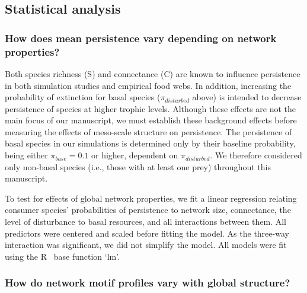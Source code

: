 \documentclass[12pt]{article}
\begin{document}
\begin{spacing}{2.0}
	\subsection*{Statistical analysis} 

        \subsubsection*{How does mean persistence vary depending on network properties?}
        
            Both species richness (S) and connectance (C) are known to influence persistence in both simulation studies and empirical food webs.
            In addition, increasing the probability of extinction for basal species ($\pi_{disturbed}$ above) is intended to decrease persistence of species at higher trophic levels.
            Although these effects are not the main focus of our manuscript, we must establish these background effects before measuring the effects of meso-scale structure on persistence.
            The persistence of basal species in our simulations is determined only by their baseline probability, being either $\pi_{base} = 0.1$ or higher, dependent on $\pi_{disturbed}$.
            We therefore considered only non-basal species (i.e., those with at least one prey) throughout this manuscript.

            To test for effects of global network properties, we fit a linear regression relating consumer species' probabilities of persistence to network size, connectance, the level of disturbance to basal resources, and all interactions between them. 
            All predictors were centered and scaled before fitting the model. 
            As the three-way interaction was significant, we did not simplify the model.
            All models were fit using the R~\citep{R} base function `lm'.

        
        \subsubsection*{How do network motif profiles vary with global structure?}
        

\end{spacing}
\end{document}
